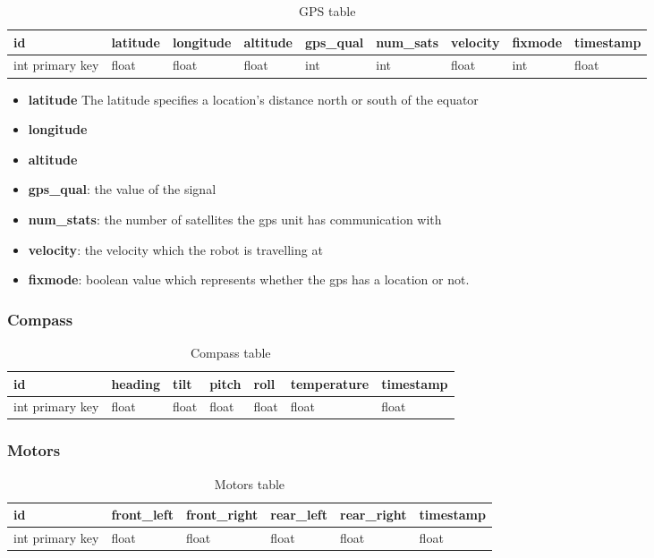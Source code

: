 \begin{table}[!htb]
\centering
\caption{GPS table}
\label{tab:db-gps}
\begin{tabular}{@{}lllllllll@{}}
\toprule
id              & latitude & longitude & altitude & gps\_qual & num\_sats & velocity & fixmode & timestamp \\ \midrule
int primary key & float    & float     & float    & int       & int       & float    & int     & float
\end{tabular}
\end{table}
\begin{itemize}
\item{\textbf{latitude}} The latitude specifies a location's distance north or south of the equator
\item{\textbf{longitude}}  
\item{\textbf{altitude}} 
\item{\textbf{gps\_qual}}: the value of the signal
\item{\textbf{num\_stats}}: the number of satellites the gps unit has communication with
\item{\textbf{velocity}}: the velocity which the robot is travelling at
\item{\textbf{fixmode}}: boolean value which represents whether the gps has a location or not.  
\end{itemize}


\subsubsection{Compass}
\begin{table}[!htb]
\centering
\caption{Compass table}
\label{tab:db-compass}
\begin{tabular}{@{}lllllll@{}}
\toprule
id              & heading & tilt  & pitch & roll  & temperature & timestamp \\ \midrule
int primary key & float   & float & float & float & float       & float
\end{tabular}
\end{table}

\subsubsection{Motors}
\begin{table}[!htb]
\centering
\caption{Motors table}
\label{tab:db-motors}
\begin{tabular}{@{}llllll@{}}
\toprule
id              & front\_left & front\_right & rear\_left & rear\_right & timestamp \\ \midrule
int primary key & float       & float        & float      & float       & float
\end{tabular}
\end{table}

